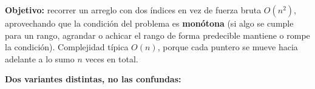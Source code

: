 \textbf{Objetivo:} recorrer un arreglo con dos índices en vez de fuerza bruta \(O(n^2)\), aprovechando que la condición del problema es \textbf{monótona} (si algo se cumple para un rango, agrandar o achicar el rango de forma predecible mantiene o rompe la condición). Complejidad típica \(O(n)\), porque cada puntero se mueve hacia adelante a lo sumo \(n\) veces en total.

\textbf{Dos variantes distintas, no las confundas:}
